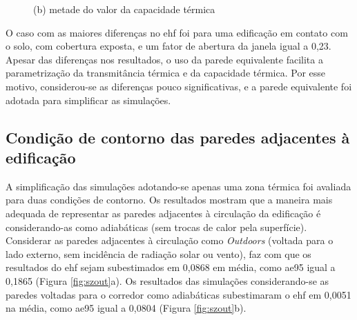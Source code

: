 \documentclass[brazil,hardcopy,openany]{ufscthesis} %
\begin{document}
\begin{figure}[h]
\begin{minipage}{.5\textwidth}
		\begin{center}
			\small{(b) metade do valor da capacidade térmica}\\
		\end{center}
	\end{minipage}
	\label{fig:par2_scatter}
\end{figure}

O caso com as maiores diferenças no \acrshort{ehf} foi para uma edificação em contato com o solo, com cobertura exposta, e um fator de abertura da janela igual a 0,23.
Apesar das diferenças nos resultados, o uso da parede equivalente facilita a parametrização da transmitância térmica e da capacidade térmica. Por esse motivo, considerou-se as diferenças pouco significativas, e a parede equivalente foi adotada para simplificar as simulações.

\subsection*{Condição de contorno das paredes adjacentes à edificação}

A simplificação das simulações adotando-se apenas uma zona térmica foi avaliada para duas condições de contorno. Os resultados mostram que a maneira mais adequada de representar as paredes adjacentes à circulação da edificação é considerando-as como adiabáticas (sem trocas de calor pela superfície).
Considerar as paredes adjacentes à circulação como \textit{Outdoors} (voltada para o lado externo, sem incidência de radiação solar ou vento), faz com que os resultados do \acrshort{ehf} sejam subestimados em 0,0868 em média, como \acrshort{ae95} igual a 0,1865 (Figura \ref{fig:szout}a).
Os resultados das simulações considerando-se as paredes voltadas para o corredor como adiabáticas subestimaram o \acrshort{ehf} em 0,0051 na média, como \acrshort{ae95} igual a 0,0804 (Figura \ref{fig:szout}b).
\end{document}
